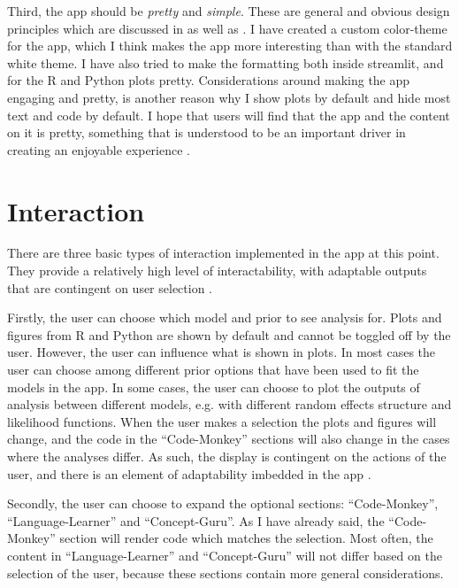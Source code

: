 \documentclass[12pt]{article}
\begin{document}
\vspace{5mm}

Third, the app should be \emph{pretty} and \emph{simple}. These are general
and obvious design principles which are discussed in
\textcite{tractinsky2000beautiful} as well as
\textcite[25-26]{hassenzahl2010experience}.
I have created a custom color-theme for the app, which I think makes the app more interesting
than with the standard white theme. I have also tried to make the formatting both inside
streamlit, and for the R and Python plots pretty. Considerations around making
the app engaging
and pretty, is another reason why I show plots by default and hide most text and code by default.
I hope that users will find that the app and the content on it is pretty,
something that is understood to be an important driver
in creating an enjoyable experience \autocite[65]{hassenzahl2010experience}.

\section{Interaction}
There are three basic types of interaction implemented in the app
at this point. They provide a relatively high level of
interactability, with adaptable outputs that are contingent on
user selection \autocite{janlert2017meaning}.

\vspace{5mm}

Firstly, the user can choose which model and prior to see analysis for.
Plots and figures from R and Python are shown by default and cannot be toggled off by the user.
However, the user can influence what is shown in plots. In most cases the user can choose
among different prior options that have been used to fit the models in the app.
In some cases, the user can choose to plot the outputs of analysis between different models,
e.g. with different random effects structure and likelihood functions.
When the user makes a selection the plots and figures will change,
and the code in the “Code-Monkey” sections will also change in the cases where the analyses differ.
As such, the display is contingent on the actions of the user,
and there is an element of adaptability imbedded in the
app \autocite{janlert2017meaning}.


\vspace{5mm}

Secondly, the user can choose to expand the optional sections:
“Code-Monkey”, “Language-Learner” and “Concept-Guru”.
As I have already said, the “Code-Monkey” section will render code which matches the selection.
Most often, the content in “Language-Learner” and “Concept-Guru” will not differ
based on the selection of the user, because these sections contain more general considerations.
\end{document}
